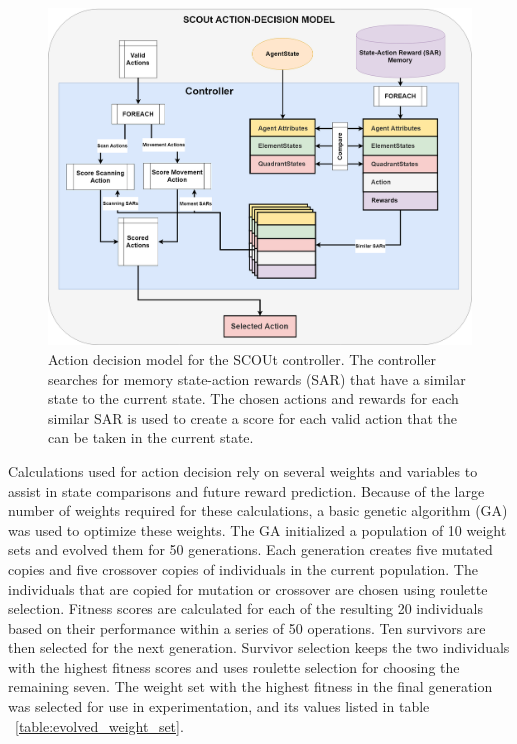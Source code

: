 \begin{figure}[!htb]
  \includegraphics[width=1.0\columnwidth]{Figures/scout_decision_model.png}
  \caption{Action decision model for the SCOUt controller. The controller searches for memory state-action rewards (SAR) that have a similar state to the current state. The chosen actions and rewards for each similar SAR is used to create a score for each valid action that the can be taken in the current state.}
  \label{fig:scout_decision_model}
\end{figure}

Calculations used for action decision rely on several weights and variables to assist in state comparisons and future reward prediction.
Because of the large number of weights required for these calculations, a basic genetic algorithm (GA) was used to optimize these weights.
The GA initialized a population of 10 weight sets and evolved them for 50 generations.
Each generation creates five mutated copies and five crossover copies of individuals in the current population.
The individuals that are copied for mutation or crossover are chosen using roulette selection.
Fitness scores are calculated for each of the resulting 20 individuals based on their performance within a series of 50 operations.
Ten survivors are then selected for the next generation.
Survivor selection keeps the two individuals with the highest fitness scores and uses roulette selection for choosing the remaining seven.
The weight set with the highest fitness in the final generation was selected for use in experimentation, and its values listed in table ~\ref{table:evolved_weight_set}.

